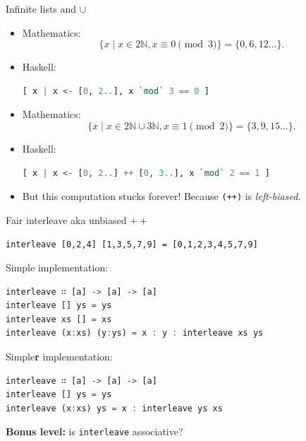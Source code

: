 \documentclass[handout]{beamer}
\def\N{\mathbb{N}}
\begin{document}
\begin{frame}[fragile]{Infinite lists and $\cup$}
\begin{adjustwidth}{-1em}{-1em}

\begin{itemize}[<+->]

\item Mathematics:
$$ \{ x \mid x \in 2\N, x \equiv 0 \!\!\! \pmod 3 \} = \{ 0, 6, 12\ldots \}.$$

\item Haskell:
\begin{lstlisting}[language=Haskell]
[ x | x <- [0, 2..], x `mod` 3 == 0 ]
\end{lstlisting}

\item Mathematics:
$$ \{ x \mid x \in 2\N \cup 3\N, x \equiv 1 \!\!\! \pmod 2 \} = \{ 3, 9, 15\ldots \}.$$

\item Haskell:
\begin{lstlisting}[language=Haskell]
[ x | x <- [0, 2..] ++ [0, 3..], x `mod` 2 == 1 ]
\end{lstlisting}

\item But this computation stucks forever! Because {\tt (++)} is {\em left-biased.}

\end{itemize}

\end{adjustwidth}
\end{frame}

\begin{frame}[fragile]{Fair interleave aka unbiased $+\!\!+$}

{\tt interleave [0,2,4] [1,3,5,7,9] = [0,1,2,3,4,5,7,9] }

\bigskip

\pause

Simple implementation:
\begin{lstlisting}[language=Haskell]
interleave ∷ [a] -> [a] -> [a]
interleave [] ys = ys
interleave xs [] = xs
interleave (x:xs) (y:ys) = x : y : interleave xs ys
\end{lstlisting}

\pause

Simple{\bf r} implementation:
\begin{lstlisting}[language=Haskell]
interleave ∷ [a] -> [a] -> [a]
interleave [] ys = ys
interleave (x:xs) ys = x : interleave ys xs
\end{lstlisting}

\pause

{\bf Bonus level:}
is {\tt interleave} associative?

\end{frame}
\end{document}
